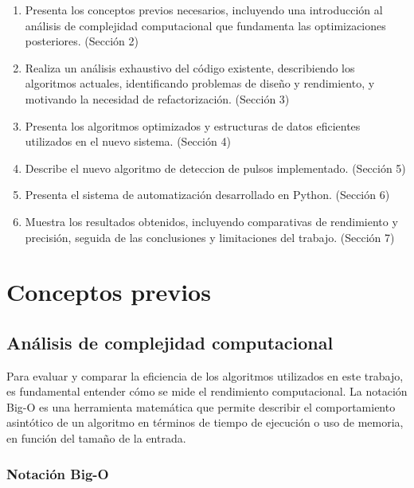 \documentclass[12pt,a4paper]{article}
\begin{document}
\begin{enumerate}
    \item Presenta los conceptos previos necesarios, incluyendo una introducción al análisis de complejidad computacional que fundamenta las optimizaciones posteriores. (Sección 2)

    \item Realiza un análisis exhaustivo del código existente, describiendo los algoritmos actuales, identificando problemas de diseño y rendimiento, y motivando la necesidad de refactorización. (Sección 3)

    \item Presenta los algoritmos optimizados y estructuras de datos eficientes utilizados en el nuevo sistema. (Sección 4)

    \item Describe el nuevo algoritmo de deteccion de pulsos implementado. (Sección 5)

    \item Presenta el sistema de automatización desarrollado en Python. (Sección 6)

    \item Muestra los resultados obtenidos, incluyendo comparativas de rendimiento y precisión, seguida de las conclusiones y limitaciones del trabajo. (Sección 7)
\end{enumerate}

\section{Conceptos previos}

\subsection{Análisis de complejidad computacional}
\lhead{}

Para evaluar y comparar la eficiencia de los algoritmos utilizados en este trabajo, es fundamental entender cómo se mide el rendimiento computacional. La notación Big-O es una herramienta matemática que permite describir el comportamiento asintótico de un algoritmo en términos de tiempo de ejecución o uso de memoria, en función del tamaño de la entrada.

\subsubsection{Notación Big-O}
\end{document}

